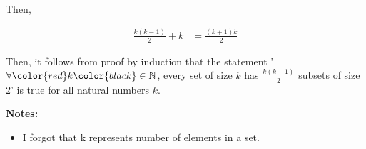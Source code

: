 \documentclass[12pt]{article}
\begin{document}
\begin{enumerate}[a.]
\begin{mdframed}
        Then,

        \color{red}
        \begin{align}
            \frac{k(k-1)}{2} + k &= \frac{(k+1)k}{2}
        \end{align}
        \color{black}

        \bigskip

        Then, it follows from proof by induction that the statement '$\forall \color{red}k\color{black} \in \mathbb{N}$,
        every set of size \color{red}$k$\color{black} has \color{red}$\frac{k(k-1)}{2}$\color{black} subsets of size 2' is true for all
        natural numbers \color{red}$k$\color{black}.

    \end{mdframed}

    \textbf{Notes:}
    \begin{itemize}
        \item I forgot that k represents number of elements in a set.
    \end{itemize}

\end{enumerate}
\end{document}
